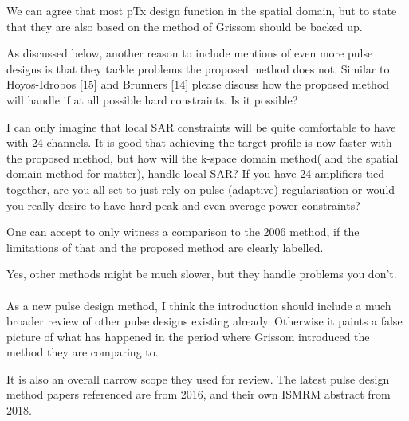 \documentclass[11pt]{article}
\begin{document}
We can agree that most pTx design function in the spatial domain, but to state that they are also based on the method of Grissom should be backed up.

As discussed below, another reason to include mentions of even more pulse designs is that they tackle problems the proposed method does not. Similar to Hoyos-Idrobos [15] and Brunners [14] please discuss how the proposed method will handle if at all possible hard constraints. Is it possible?

I can only imagine that local SAR constraints will be quite comfortable to have with 24 channels. It is good that achieving the target profile is now faster with the proposed method, but how will the k-space domain method( and the spatial domain method for matter), handle local SAR? If you have 24 amplifiers tied together, are you all set to just rely on pulse (adaptive) regularisation or would you really desire to have hard peak and even average power constraints?

One can accept to only witness a comparison to the 2006 method, if the limitations of that and the proposed method are clearly labelled.

Yes, other methods might be much slower, but they handle problems you don't.
\\[0.2em]
\indent{\it \textcolor{blue}{We agree that we need to tone down the language here. We have revised wording to indicate that nearly all parallel transmission studies have been formulated in the spatial domain, rather than being explicitly derived directly from the spatial domain method.
We have also added in the Discussion that it is not clear at this time whether or how hard power or SAR constraints could be directly built in to the method,
though the method would be compatible with parallel transmit VERSE methods.}}
\\[1.2em]

 As a new pulse design method, I think the introduction should include a much broader review of other pulse designs existing already. Otherwise it paints a false picture of what has happened in the period where Grissom introduced the method they are comparing to.

It is also an overall narrow scope they used for review. The latest pulse design method papers referenced are from 2016, and their own ISMRM abstract from 2018.
\end{document}
